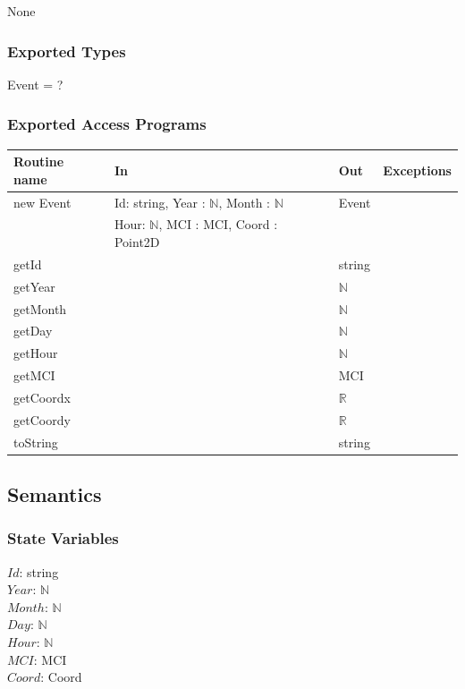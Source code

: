 \documentclass[12pt]{article}
\begin{document}
None

\subsubsection* {Exported Types}

Event = ?

\subsubsection* {Exported Access Programs}

\begin{tabular}{| l | l | l | p{5cm} |}
\hline
\textbf{Routine name} & \textbf{In} & \textbf{Out} & \textbf{Exceptions}\\
\hline
new Event & Id: string, Year : $\mathbb{N}$, Month : $\mathbb{N}$ & Event & \\
~  &  Hour: $\mathbb{N}$, MCI : MCI, Coord : Point2D& ~ & \\
\hline
getId & ~ & string  & ~\\
\hline
getYear & ~ & $\mathbb{N}$ & ~\\
\hline
getMonth & ~ & $\mathbb{N}$& ~\\
\hline
getDay & ~ &$\mathbb{N}$ & ~\\
\hline
getHour & ~ & $\mathbb{N}$ & ~\\
\hline
getMCI & ~ & MCI & ~\\
\hline
getCoordx & & $\mathbb{R}$ & ~\\
\hline
getCoordy & & $\mathbb{R}$ & ~\\
\hline
toString & ~ & string & ~\\
\hline
\end{tabular}

\subsection* {Semantics}

\subsubsection* {State Variables}

$Id$: string\\
$Year$: $\mathbb{N}$\\
$Month$: $\mathbb{N}$\\
$Day$: $\mathbb{N}$\\
$Hour$: $\mathbb{N}$\\
$MCI$: MCI\\
$Coord$: Coord\\
\end{document}

